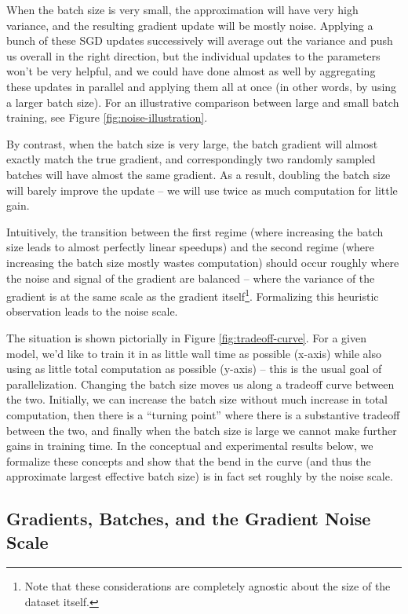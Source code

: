 \documentclass[english]{article}
\begin{document}
When the batch size is very small, the approximation will have very high variance, and the resulting gradient update will be mostly noise. Applying a bunch of these SGD updates successively will average out the variance and push us overall in the right direction, but the individual updates to the parameters won't be very helpful, and we could have done almost as well by aggregating these updates in parallel and applying them all at once (in other words, by using a larger batch size).  For an illustrative comparison between large and small batch training, see Figure \ref{fig:noise-illustration}.

By contrast, when the batch size is very large, the batch gradient will almost exactly match the true gradient, and correspondingly two randomly sampled batches will have almost the same gradient.  As a result, doubling the batch size will barely improve the update -- we will use twice as much computation for little gain.

Intuitively, the transition between the first regime (where increasing the batch size leads to almost perfectly linear speedups) and the second regime (where increasing the batch size mostly wastes computation) should occur roughly where the noise and signal of the gradient are balanced -- where the variance of the gradient is at the same scale as the gradient itself\footnote{Note that these considerations are completely agnostic about the size of the dataset itself.}. Formalizing this heuristic observation leads to the noise scale.

The situation is shown pictorially in Figure \ref{fig:tradeoff-curve}. For a given model, we'd like to train it in as little wall time as possible (x-axis) while also using as little total computation as possible (y-axis) -- this is the usual goal of parallelization. Changing the batch size moves us along a tradeoff curve between the two. Initially, we can increase the batch size without much increase in total computation, then there is a ``turning point'' where there is a substantive tradeoff between the two, and finally when the batch size is large we cannot make further gains in training time. In the conceptual and experimental results below, we formalize these concepts and show that the bend in the curve (and thus the approximate largest effective batch size) is in fact set roughly by the noise scale.

\subsection{Gradients, Batches, and the Gradient Noise Scale}
\end{document}
